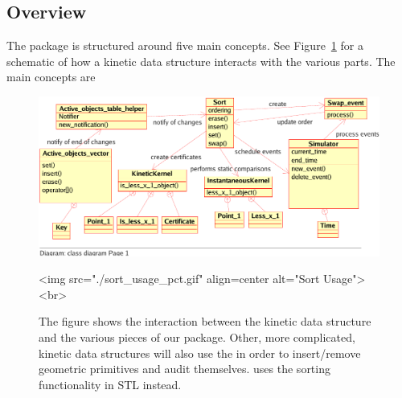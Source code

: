 \subsection{Overview}
\label{sec:overview}
The package is structured around five main concepts. See
Figure~\ref{uml_usage} for a schematic of how a kinetic data
structure interacts with the various parts. The main concepts are
 
\begin{figure}
\begin{ccTexOnly}
\begin{center}
\includegraphics[scale=.8,viewport=0 18 470 250, clip]{Kinetic_data_structures/sort_usage_pct}
\end{center}
\end{ccTexOnly}
\begin{ccHtmlOnly}
<img src="./sort_usage_pct.gif" align=center alt="Sort Usage"><br>
\end{ccHtmlOnly}
\caption{\label{uml_usage} The figure shows the interaction between
  the  kinetic data structure and
  the various pieces of our package.  Other, more complicated, kinetic
  data structures will also use the  in order
  to insert/remove geometric primitives and audit
  themselves.  uses the sorting
  functionality in STL instead.}
\end{figure}

